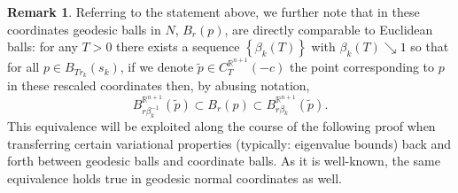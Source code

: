 \documentclass[10pt]{article}
\theoremstyle{definition}\newtheorem{definition}[thm]{Definition}
\newtheorem{rmk}[thm]{Remark}
\numberwithin{equation}{section}
\newcommand{\R}{\mathbb{R}}\newcommand{\C}{\mathbb{C}}\newcommand{\N}{\mathbb{N}}
\begin{document}
        	 	\begin{rmk}\label{rmk:equivballs}
        	 			Referring to the statement above, we further note that in these coordinates geodesic balls in $N$, $B_r(p)$, are directly comparable to Euclidean balls: for any $T>0$ there exists a sequence $\left\{\beta_k(T)\right\}$ with $\beta_k(T) \searrow 1$ so that for all $p\in B_{Tr_k}(s_k)$, if we denote $\widetilde{p}\in C^{\R^{n+1}}_{T}(-c)$ the point corresponding to $p$ in these rescaled coordinates then, by abusing notation,  
        	 			$$B^{\R^{n+1}}_{r\beta_k^{-1}}(\widetilde{p}) \subset B_r(p)\subset B^{\R^{n+1}}_{r \beta_k}(\widetilde{p}).$$
        	 		 This equivalence will be exploited along the course of the following proof when transferring certain variational properties (typically: eigenvalue bounds) back and forth between geodesic balls and coordinate balls. As it is well-known, the same equivalence holds true in geodesic normal coordinates as well.
        	 	\end{rmk}	
        	 	
        
        	 	
        	 	
        	 	
        	 	
        	 	
        	 	
        	 	
\end{document}
